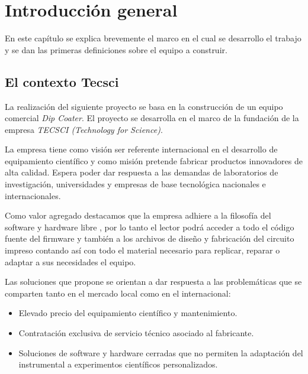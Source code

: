 
\chapter{Introducción general} %

\label{Chapter1} %


En este capítulo se explica brevemente el marco en el cual se desarrollo el trabajo y se dan las primeras definiciones sobre el equipo a construir. 
\section{El contexto Tecsci}

La realización del siguiente proyecto se basa en la construcción de un equipo comercial \textit{Dip Coater}. El proyecto se desarrolla en el marco de la fundación de la empresa \textit{TECSCI (Technology for Science)}.

La empresa tiene como visión ser referente internacional en el desarrollo de equipamiento científico y como misión pretende fabricar productos innovadores de alta calidad. Espera poder dar respuesta a las demandas de laboratorios de investigación, universidades y empresas de base tecnológica nacionales e internacionales.

Como valor agregado destacamos que la empresa adhiere a la filosofía del software y hardware libre \citep{web_oshwa}, por lo tanto el lector podrá acceder a todo el código fuente del firmware\citep{web_firmware_tecsci} y también a los archivos de diseño y fabricación del circuito impreso\citep{web_hardware_tecsci} contando así con todo el material necesario para replicar, reparar o adaptar a sus necesidades el equipo.

Las soluciones que propone se orientan a dar respuesta a las problemáticas que se comparten tanto en el mercado local como en el internacional:
\begin{itemize}
\item Elevado precio del equipamiento científico y mantenimiento.
\item Contratación exclusiva de servicio técnico asociado al fabricante.
\item Soluciones de software y hardware cerradas que no permiten la adaptación del instrumental a experimentos científicos personalizados.
\end{itemize}


